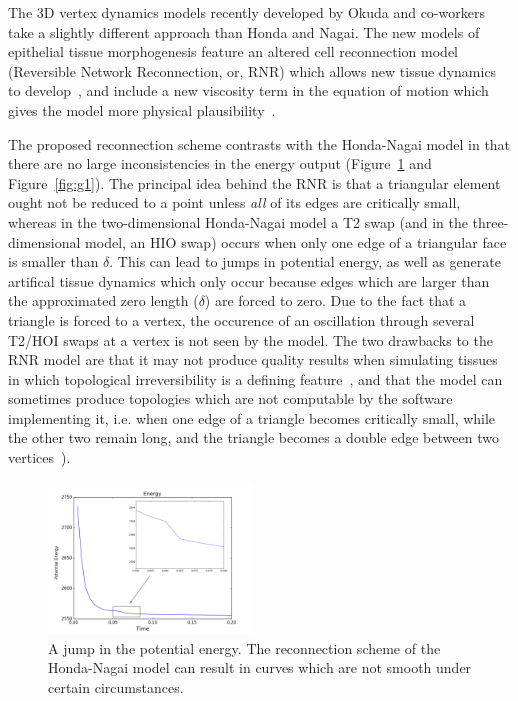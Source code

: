 The 3D vertex dynamics models recently developed by Okuda and co-workers take a slightly different approach than Honda and Nagai. The new models of epithelial tissue morphogenesis feature an altered cell reconnection model (Reversible Network Reconnection, or, RNR) which allows new tissue dynamics to develop~\cite{Okuda1}, and include a new viscosity term in the equation of motion which gives the model more physical plausibility~\cite{Okuda3}.

The proposed reconnection scheme contrasts with the Honda-Nagai model in that there are no large inconsistencies in the energy output (Figure~\ref{fig:jump} and Figure~\ref{fig:g1}). The principal idea behind the RNR is that a triangular element ought not be reduced to a point unless \emph{all} of its edges are critically small, whereas in the two-dimensional Honda-Nagai model a T2 swap (and in the three-dimensional model, an HIO swap) occurs when only one edge of a triangular face is smaller than $\delta$. This can lead to jumps in potential energy, as well as generate artifical tissue dynamics which only occur because edges which are larger than the approximated zero length ($\delta$) are forced to zero. Due to the fact that a triangle is forced to a vertex, the occurence of an oscillation through several T2/HOI swaps at a vertex is not seen by the model. The two drawbacks to the RNR model are that it may not produce quality results when simulating tissues in which topological irreversibility is a defining feature~\cite{CellSurf}, and that the model can sometimes produce topologies which are not computable by the software implementing it, i.e. when one edge of a triangle becomes critically small, while the other two remain long, and the triangle becomes a double edge between two vertices~\cite{Okuda3}).

\begin{figure}
  \begin{center}
    \includegraphics[width=0.48\textwidth]{../diagrams/jump.png}
  \end{center}
\caption[A non-smooth energy curve.]{A jump in the potential energy. The reconnection scheme of the Honda-Nagai model can 
result in curves which are not smooth under certain circumstances.}
\label{fig:jump}
\end{figure}

